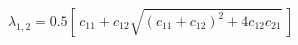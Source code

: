 \documentclass[english]{ccdconf}
\begin{document}
%
%
%
%
\begin{equation}
  \label{eq1}
  \lambda_{1,2} = 0.5 \left[\, c_{11} + c_{12}
            \sqrt{(c_{11} + c_{12})^2 + 4 c_{12} c_{21}} \,\right]
\end{equation}
%
%
%
%
%
%
%
\end{document}
